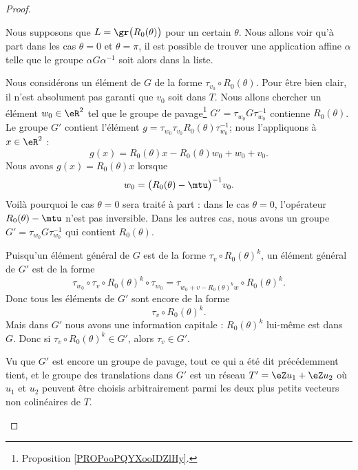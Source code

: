 \begin{proof}
\begin{subproof}

		Nous supposons que \( L=\gr\big( R_0(\theta) \big)\) pour un certain \( \theta\). Nous allons voir qu'à part dans les cas \( \theta=0\) et \( \theta=\pi\), il est possible de trouver une application affine \( \alpha\) telle que le groupe \( \alpha G\alpha^{-1}\) soit alors dans la liste.

		Nous considérons un élément de \( G\) de la forme \( \tau_{v_0}\circ R_0(\theta)\). Pour être bien clair, il n'est absolument pas garanti que \( v_0\) soit dans \( T\). Nous allons chercher un élément \( w_0\in \eR^2\) tel que le groupe de pavage\footnote{Proposition \ref{PROPooPQYXooIDZlHy}.} \( G'=\tau_{w_0}G\tau_{w_0}^{-1}\) contienne \( R_0(\theta)\). Le groupe \( G'\) contient l'élément \( g=\tau_{w_0}\tau_{v_0}R_0(\theta)\tau_{w_0}^{-1}\); nous l'appliquons à \( x\in \eR^2\) :
		\begin{equation}
			g(x)=R_0(\theta)x-R_0(\theta)w_0+w_0+v_0.
		\end{equation}
		Nous avons \( g(x)=R_0(\theta)x\) lorsque
		\begin{equation}
			w_0=\big( R_0(\theta)-\mtu \big)^{-1}v_0.
		\end{equation}
		Voilà pourquoi le cas \( \theta=0\) sera traité à part : dans le cas \( \theta=0\), l'opérateur \( R_0(\theta)-\mtu\) n'est pas inversible. Dans les autres cas, nous avons un groupe \( G'=\tau_{w_0}G\tau_{w_0}^{-1}\) qui contient \( R_0(\theta)\).

		Puisqu'un élément général de \( G\) est de la forme \( \tau_v\circ R_0(\theta)^k\), un élément général de \( G' \) est de la forme
		\begin{equation}
			\tau_{w_0}\circ \tau_v\circ R_0(\theta)^k\circ \tau_{w_0}=\tau_{w_0+v-R_0(\theta)^kw}\circ R_0(\theta)^k.
		\end{equation}
		Donc tous les éléments de \( G'\) sont encore de la forme
		\begin{equation}
			\tau_v\circ R_0(\theta)^k.
		\end{equation}
		Mais dans \( G'\) nous avons une information capitale : \( R_0(\theta)^k\) lui-même est dans \( G\). Donc si \( \tau_v\circ R_0(\theta)^k\in G'\), alors \( \tau_v\in G'\).

		Vu que \( G'\) est encore un groupe de pavage, tout ce qui a été dit précédemment tient, et le groupe des translations dans \( G'\) est un réseau \( T'=\eZ u_1+\eZ u_2\) où \( u_1\) et \( u_2\) peuvent être choisis arbitrairement parmi les deux plus petits vecteurs non colinéaires de \( T\).


\end{subproof}
\end{proof}
